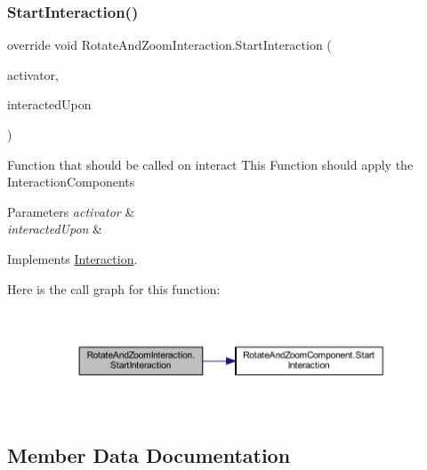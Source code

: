 \mbox{\label{class_rotate_and_zoom_interaction_ad92e1c40e9cbb2fb3dcf234e72d0e595}} 
\subsubsection{\texorpdfstring{Start\+Interaction()}{StartInteraction()}}
{\footnotesize\ttfamily override void Rotate\+And\+Zoom\+Interaction.\+Start\+Interaction (\begin{DoxyParamCaption}\item[{Game\+Object}]{activator,  }\item[{Game\+Object}]{interacted\+Upon }\end{DoxyParamCaption})\hspace{0.3cm}{\ttfamily [virtual]}}



Function that should be called on interact This Function should apply the Interaction\+Components 


\begin{DoxyParams}{Parameters}
{\em activator} & \\
\hline
{\em interacted\+Upon} & \\
\hline
\end{DoxyParams}


Implements \mbox{\hyperlink{class_interaction_afa5031e1db8f7c23cf26c896937e69f9}{Interaction}}.

Here is the call graph for this function\+:
\nopagebreak
\begin{figure}[H]
\begin{center}
\leavevmode
\includegraphics[width=350pt]{class_rotate_and_zoom_interaction_ad92e1c40e9cbb2fb3dcf234e72d0e595_cgraph}
\end{center}
\end{figure}


\subsection{Member Data Documentation}
\mbox{\label{class_rotate_and_zoom_interaction_aa7e134944534d6e72863edcd54a87d8f}} 

